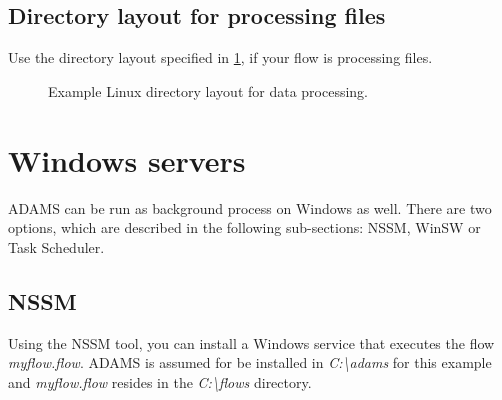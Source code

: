 \clearpage
\subsection{Directory layout for processing files}
Use the directory layout specified in \ref{example_linux_dir_layout_data_processing},
if your flow is processing files.
\begin{figure}[htb]
  \caption{Example Linux directory layout for data processing.}
  \label{example_linux_dir_layout_data_processing}
\end{figure}

\clearpage
\section{Windows servers}
ADAMS can be run as background process on Windows as well. There are two options,
which are described in the following sub-sections: NSSM\cite{nssm}, WinSW\cite{winsw}
or Task Scheduler\cite{taskschd}.

\subsection{NSSM}
Using the NSSM\cite{nssm} tool, you can install a Windows service that executes the flow \textit{myflow.flow}.
ADAMS is assumed for be installed in \textit{C:\textbackslash adams} for this
example and \textit{myflow.flow} resides in the \textit{C:\textbackslash flows}
directory.

